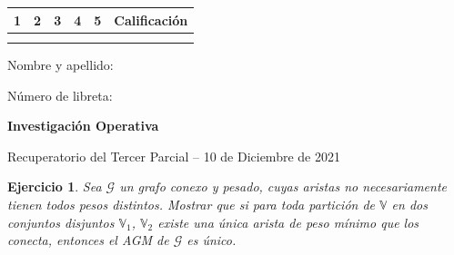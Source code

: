 \documentclass[a4paper,oneside,12pt]{amsart}
\newcommand{\nombremateria}
{Investigaci\'on Operativa}
\newcommand{\numeroparcial}
    {Recuperatorio del Tercer Parcial }
\newcommand{\fecha}
    {10 de Diciembre de 2021}
\newtheorem{quest}{Ejercicio}
\begin{document}
\hfill \hfill
\begin{tabular}[c]{|c|c|c|c|c|c|}
\hline 
1 & 2 & 3 & 4 & 5 & Calificaci\'on \\ \hline \hline
\hspace{1.2 cm} & \hspace{1.2 cm} & \hspace{1.2 cm} & \hspace{1.2 cm} & \hspace{1.2 cm} &\hspace{1.5 cm} \\
\hspace{1.2 cm} & \hspace{1.2 cm} & \hspace{1.2 cm} & \hspace{1.2 cm} & \hspace{1.2 cm} &\hspace{1.5 cm} \\ \hline

\end{tabular}

\vspace{-1cm}

\noindent Nombre y apellido:

\vspace{0.2cm}

\noindent Número de libreta:

\noindent \hrulefill 

\smallskip
\renewcommand{\baselinestretch}{1.1}

\begin{center}
	\large \textbf{\nombremateria} 
	
	\numeroparcial -- \fecha
\end{center}

\vspace{.6cm}
\renewcommand{\theenumi}{\textbf{\arabic{enumi}}}


\begin{quest} 
Sea $\mathcal{G}$ un grafo conexo y pesado, cuyas aristas no necesariamente tienen todos pesos distintos. Mostrar que si para toda partición de $\mathbb{V}$ en dos conjuntos disjuntos $\mathbb{V}_1$, $\mathbb{V}_2$ existe una única arista de peso mínimo que los conecta, entonces el AGM de $\mathcal{G}$ es único.

\end{quest}

\end{document}
